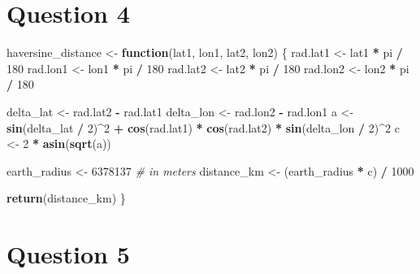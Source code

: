 \documentclass[
]{article}
\newenvironment{Shaded}{\begin{snugshade}}{\end{snugshade}}
\newcommand{\CommentTok}[1]{\textcolor[rgb]{0.56,0.35,0.01}{\textit{#1}}}
\newcommand{\ControlFlowTok}[1]{\textcolor[rgb]{0.13,0.29,0.53}{\textbf{#1}}}
\newcommand{\DecValTok}[1]{\textcolor[rgb]{0.00,0.00,0.81}{#1}}
\newcommand{\FunctionTok}[1]{\textcolor[rgb]{0.13,0.29,0.53}{\textbf{#1}}}
\newcommand{\NormalTok}[1]{#1}
\newcommand{\OtherTok}[1]{\textcolor[rgb]{0.56,0.35,0.01}{#1}}
\newcommand{\SpecialCharTok}[1]{\textcolor[rgb]{0.81,0.36,0.00}{\textbf{#1}}}
\begin{document}
\section{Question 4}\label{question-4}

\begin{Shaded}
\begin{Highlighting}[]
\NormalTok{haversine\_distance }\OtherTok{\textless{}{-}} \ControlFlowTok{function}\NormalTok{(lat1, lon1, lat2, lon2) \{}
\NormalTok{  rad.lat1 }\OtherTok{\textless{}{-}}\NormalTok{ lat1 }\SpecialCharTok{*}\NormalTok{ pi }\SpecialCharTok{/} \DecValTok{180}
\NormalTok{  rad.lon1 }\OtherTok{\textless{}{-}}\NormalTok{ lon1 }\SpecialCharTok{*}\NormalTok{ pi }\SpecialCharTok{/} \DecValTok{180}
\NormalTok{  rad.lat2 }\OtherTok{\textless{}{-}}\NormalTok{ lat2 }\SpecialCharTok{*}\NormalTok{ pi }\SpecialCharTok{/} \DecValTok{180}
\NormalTok{  rad.lon2 }\OtherTok{\textless{}{-}}\NormalTok{ lon2 }\SpecialCharTok{*}\NormalTok{ pi }\SpecialCharTok{/} \DecValTok{180}
  
\NormalTok{  delta\_lat }\OtherTok{\textless{}{-}}\NormalTok{ rad.lat2 }\SpecialCharTok{{-}}\NormalTok{ rad.lat1}
\NormalTok{  delta\_lon }\OtherTok{\textless{}{-}}\NormalTok{ rad.lon2 }\SpecialCharTok{{-}}\NormalTok{ rad.lon1}
\NormalTok{  a }\OtherTok{\textless{}{-}} \FunctionTok{sin}\NormalTok{(delta\_lat }\SpecialCharTok{/} \DecValTok{2}\NormalTok{)}\SpecialCharTok{\^{}}\DecValTok{2} \SpecialCharTok{+} \FunctionTok{cos}\NormalTok{(rad.lat1) }\SpecialCharTok{*} \FunctionTok{cos}\NormalTok{(rad.lat2) }\SpecialCharTok{*} \FunctionTok{sin}\NormalTok{(delta\_lon }\SpecialCharTok{/} \DecValTok{2}\NormalTok{)}\SpecialCharTok{\^{}}\DecValTok{2}
\NormalTok{  c }\OtherTok{\textless{}{-}} \DecValTok{2} \SpecialCharTok{*} \FunctionTok{asin}\NormalTok{(}\FunctionTok{sqrt}\NormalTok{(a))}
  
\NormalTok{  earth\_radius }\OtherTok{\textless{}{-}} \DecValTok{6378137}  \CommentTok{\# in meters}
\NormalTok{  distance\_km }\OtherTok{\textless{}{-}}\NormalTok{ (earth\_radius }\SpecialCharTok{*}\NormalTok{ c) }\SpecialCharTok{/} \DecValTok{1000}
  
  \FunctionTok{return}\NormalTok{(distance\_km)}
\NormalTok{\}}
\end{Highlighting}
\end{Shaded}

\section{Question 5}\label{question-5}
\end{document}
